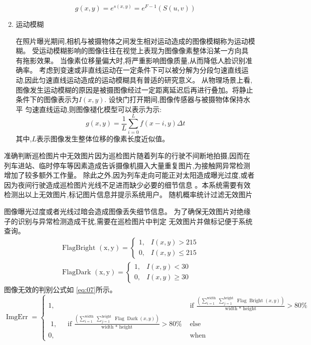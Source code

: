 \documentclass{amsart}
\begin{document}
\begin{enumerate}
  \begin{equation}
    \label{eq:04}
g(x, y)=e^{s(x, y)}=e^{F-1}(S(u, v))
  \end{equation}

\item 运动模糊

  在照片曝光期间,相机与被摄物体之间发生相对运动造成的图像模糊称为运动模糊。
  受运动模糊影响的图像往往在视觉上表现为图像像素整体沿某一方向具有拖影效果。
  当像素位移量偏大时,将严重影响图像质量,从而降低人脸识别准确率。
  考虑到变速或非直线运动在一定条件下可以被分解为分段匀速直线运动,因此匀速直线运动造成的运动模糊具有普适的研究意义。
  从物理场景上看,图像发生运动模糊的原因是被摄图像经过一定距离延迟后再进行叠加。将静止条件下的图像表示为$I(x,y)$.
  设快门打开期间,图像传感器与被摄物体保持水平
  匀速直线运动,则图像褪化模型可以表示为示:
  \begin{equation}
    \label{eq:05}
g(x, y)=\frac{1}{L} \sum_{i=0}^{L} f(x-i, y) \Delta t
  \end{equation}
  其中,$L$表示图像发生整体位移的像素长度近似值。
\end{enumerate}


\cite{gaohuihuang}
准确判断巡检图片中无效图片因为巡检图片随着列车的行驶不间断地拍摄,因而在列车进站、临时停车等因素造成告诉摄像机摄入大量重复图片,为接触网异常检测增加了较多额外工作量。
除此之外,因为列车走向可能正对太阳造成曝光过度,或者因为夜间行驶造成巡检图片光线不足进而缺少必要的细节信息
。本系统需要有效检测出以上无效图片,标记图片信息并提示系统用户。
随机概率统计过滤无效图片

图像曝光过度或者光线过暗会造成图像丢失细节信息。
为了确保无效图片对绝缘子的识别与异常检测造成干扰,需要在巡检图片中判定
无效图片并做标记便于系统查询。
  \begin{equation}
    \label{eq:06}
\begin{array}{l}
\text { FlagBright }(\mathrm{x}, \mathrm{y})=\left\{\begin{array}{ll}
1, & I(x, y)>215 \\
0, & I(x, y) \leq 215
\end{array}\right. \\
\text { FlagDark }(\mathrm{x}, \mathrm{y})=\left\{\begin{array}{ll}
1, & I(x, y)<30 \\
0, & I(x, y) \geq 30
\end{array}\right.
\end{array}
\end{equation}
图像无效的判别公式如 \ref{eq:07}所示。
\begin{equation}
  \label{eq:07}
\operatorname{ImgErr}=\left\{\begin{array}{cc}
1, & \text { if } \frac{\left(\sum_{i=1}^{\text {width }} \sum_{j=1}^{\text {height }} \operatorname{Flag} \operatorname{Bright}(x, y)\right)}{\text { width * height }}>80 \% \\
\text { 1, } \quad \text { if } \frac{\left(\sum_{i=1}^{\text {width }} \sum_{j=1}^{\text {height }} \operatorname{Flag} \operatorname{Dark}(x, y)\right)}{\text { width * height }}>80 \% & \text { else } \\
0, & \text { when }
\end{array}\right.
\end{equation}
\end{document}
